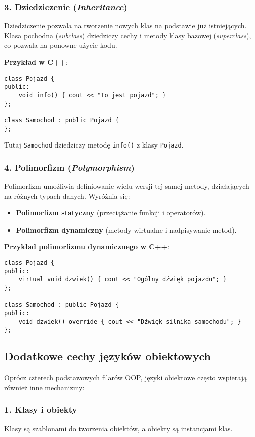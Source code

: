 \subsubsection{3. Dziedziczenie (\textit{Inheritance})}
Dziedziczenie pozwala na tworzenie nowych klas na podstawie już istniejących. Klasa pochodna (\textit{subclass}) dziedziczy cechy i metody klasy bazowej (\textit{superclass}), co pozwala na ponowne użycie kodu.

\textbf{Przykład w C++}:
\begin{verbatim}
class Pojazd {
public:
    void info() { cout << "To jest pojazd"; }
};

class Samochod : public Pojazd {
};
\end{verbatim}
Tutaj \texttt{Samochod} dziedziczy metodę \texttt{info()} z klasy \texttt{Pojazd}.

\subsubsection{4. Polimorfizm (\textit{Polymorphism})}
Polimorfizm umożliwia definiowanie wielu wersji tej samej metody, działających na różnych typach danych. Wyróżnia się:
\begin{itemize}
    \item \textbf{Polimorfizm statyczny} (przeciążanie funkcji i operatorów).
    \item \textbf{Polimorfizm dynamiczny} (metody wirtualne i nadpisywanie metod).
\end{itemize}

\textbf{Przykład polimorfizmu dynamicznego w C++}:
\begin{verbatim}
class Pojazd {
public:
    virtual void dzwiek() { cout << "Ogólny dźwięk pojazdu"; }
};

class Samochod : public Pojazd {
public:
    void dzwiek() override { cout << "Dźwięk silnika samochodu"; }
};
\end{verbatim}

\subsection{Dodatkowe cechy języków obiektowych}
Oprócz czterech podstawowych filarów OOP, języki obiektowe często wspierają również inne mechanizmy:

\subsubsection{1. Klasy i obiekty}
Klasy są szablonami do tworzenia obiektów, a obiekty są instancjami klas.

